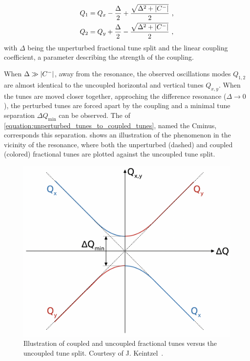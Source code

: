 \begin{equation}
    \begin{aligned}
        Q_1 &= Q_x- \frac{\Delta}{2} + \frac{\sqrt{\Delta^2 + \left\lvert C^{-} \right\rvert}}{2} \text{ ,} \\
        Q_2 &= Q_y+ \frac{\Delta}{2} - \frac{\sqrt{\Delta^2 + \left\lvert C^{-} \right\rvert}}{2} \text{ ,}
    \end{aligned}
    \label{equation:unperturbed_tunes_to_coupled_tunes}
\end{equation}
with \(\Delta\) being the unperturbed fractional tune split and  the linear coupling coefficient, a parameter describing the strength of the coupling.

When \(\Delta \gg \left\lvert C^{-} \right\rvert\), away from the resonance, the observed oscillations modes \(Q_{1,2}\) are almost identical to the uncoupled horizontal and vertical tunes \(Q_{x,y}\).
When the tunes are moved closer together, approching the difference resonance (\(\Delta \rightarrow 0\)), the perturbed tunes are forced apart by the coupling and a minimal tune separation \(\Delta Q_{\mathrm{min}}\) can be observed.
The  of \cref{equation:unperturbed_tunes_to_coupled_tunes}, named the \gls{Cminus}, corresponds this separation.
 shows an illustration of the phenomenon in the vicinity of the resonance, where both the unperturbed (dashed) and coupled (colored) fractional tunes are plotted against the uncoupled tune split.

\begin{figure}[!htb]
    \centering
    \includegraphics[width = 0.9\linewidth]{Figures/Beam_Dynamics_Theory/closest_tune_approach_schematic.png}
    \caption{Illustration of coupled and uncoupled fractional tunes versus the uncoupled tune split. Courtesy of J. Keintzel~\cite{PHD:Keintzel}.}
    \label{figure:closest_tune_approach}
\end{figure}


